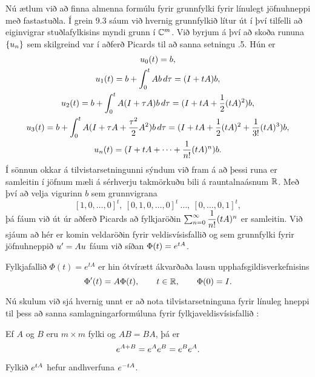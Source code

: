 \noindent
Nú ætlum við að finna almenna formúlu fyrir grunnfylki fyrir línulegt
jöfnuhneppi með fastastuðla.  Í grein 9.3 sáum við hvernig
grunnfylkið lítur út í því tilfelli að eiginvigrar stuðlafylkisins
myndi grunn í ${\mathbb C}\sp m$.  Við byrjum á því að skoða rununa ${\{u_n\}}$ sem skilgreind var í aðferð Picards til að sanna setningu
.5.  Hún er 
\begin{gather*}
u_0(t)=b,\\
u_1(t)=b+\int_0\sp t Ab \, d\tau = (I+tA)b,\\
u_2(t)=b+\int_0\sp t A(I+\tau A)b \, d\tau = (I+tA+\dfrac 12(tA)\sp 2)b,\\
u_3(t)=b+\int_0\sp t A(I+\tau A + \dfrac{\tau\sp 2}2A\sp 2)b \, d\tau 
= (I+tA+\dfrac 12(tA)\sp 2+\dfrac 1{3!}(tA)\sp 3)b,\\
u_n(t)= (I+tA+\dots+\dfrac 1{n!}(tA)\sp n)b.
\end{gather*}
Í sönnun okkar á tilvistarsetningunni sýndum við fram á að þessi runa
er samleitin í jöfnum mæli á sérhverju takmörkuðu bili á
rauntalnaásnum ${\mathbb R}$.
Með því að velja vigurinn $b$ sem grunnvigrana 
$$[1,0,\dots,0]^t, \ [0,1,0,\dots,0]^t\ \dots, 
\ [0,\dots,0,1]^t,$$ 
þá fáum við út úr aðferð Picards að fylkjaröðin
$\sum_{n=0}\sp \infty 
\dfrac 1{n!}(tA)\sp n$ er samleitin.  Við sjáum að hér er komin
veldaröðin fyrir veldisvísisfallið og sem grunnfylki fyrir
jöfnuhneppið $u{\sp{\prime}}=Au$ fáum við síðan $\Phi(t)=e\sp {tA}$.  

\begin{se}
Fylkjafallið $\Phi(t)= e^{tA}$ er hin ótvírætt ákvarðaða lausn
upphafsgildisverkefnisins
 $$\Phi{\sp{\prime}}(t) = A\Phi(t), \qquad t\in {\mathbb R}, \qquad \Phi(0)=I.
 $$
\end{se} 

\medskip
Nú skulum við sjá hvernig unnt er að nota tilvistarsetninguna fyrir
línuleg hneppi til þess að sanna samlagningarformúluna fyrir
fylkja\-veldis\-vísis\-fallið
: 

\begin{se}\label{set5.5.2}
Ef $A$ og $B$ eru $m\times m$ fylki og $AB=BA$, þá er
 \begin{equation*}e\sp{A+B}=e\sp Ae\sp B=e^Be^A.\label{5.5.1}
 \end{equation*}
\end{se}

\begin{fs}
Fylkið $e\sp {tA}$ hefur andhverfuna $e\sp{-tA}$.
\end{fs}

